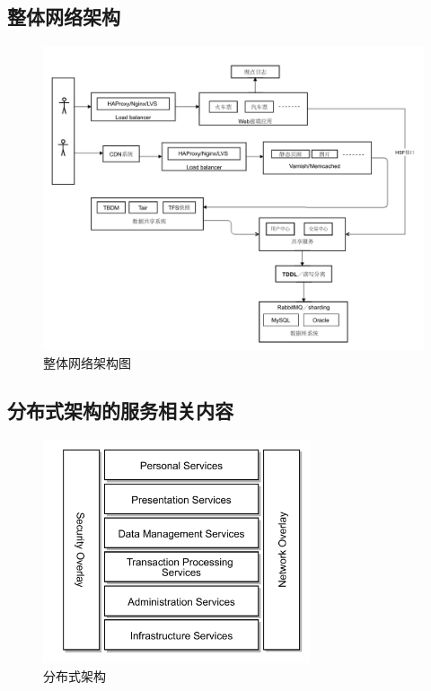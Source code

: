 \subsection{整体网络架构}
\begin{figure}[H]
	\centering
	\includegraphics[width=1.0\textwidth]{graphics/tech.pdf}
	\caption{整体网络架构图}
	\label{fig:tech}
\end{figure}


\subsection{分布式架构的服务相关内容}
\begin{figure}[H]
	\centering
	\includegraphics[width=0.7\textwidth]{graphics/architecture.pdf}
	\caption{分布式架构}
	\label{fig:architecture}
\end{figure}

